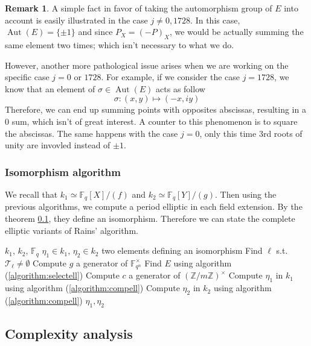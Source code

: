 \documentclass[12pt]{article}
\theoremstyle{plain}
\theoremstyle{definition}
\newtheorem*{remark}{Remark}
\DeclareMathOperator{\Aut}{Aut}
\def\Z{\ensuremath{\mathbb{Z}}}
\def\F{\ensuremath{\mathbb{F}}}
\newcounter{algorithm}
\begin{document}
\begin{remark}
A simple fact in favor of taking the automorphism group of $E$ into account is
easily illustrated in the case $j\neq0,1728$. In this case, $\Aut(E) =
\lbrace{\pm1}\rbrace$ and since $P_X = (-P)_X$, we would be actually summing the
same element two times; which isn't necessary to what we do.

However, another more pathological issue arises when we are working on the
specific case $j = 0$ or $1728$. For example, if we consider the case $j =
1728$, we know that an element of $\sigma\in\Aut(E)$ acts as follow
\[
\sigma : (x,y) \mapsto (-x, iy)
\]
Therefore, we can end up summing points with opposites abscissas, resulting in a
$0$ sum, which isn't of great interest. A counter to this phenomenon is to
square the abscissas. The same happens with the case $j = 0$, only this time
$3$rd roots of unity are invovled instead of $\pm1$.
\end{remark}

\subsubsection{Isomorphism algorithm}

We recall that $k_1\simeq\F_q[X]/(f)$ and $k_2\simeq\F_q[Y]/(g)$. Then using the
previous algorithms, we compute a period elliptic in each field extension. By
the theorem \ref{}, they define an isomorphism. Therefore we can state the
complete elliptic variants of Rains' algorithm.

\begin{algorithm}
\label{algorithm:rainsell}
    \begin{algorithmic}[1]
    \REQUIRE $k_1$, $k_2$, $\F_q$
    \ENSURE $\eta_1\in k_1$, $\eta_2\in k_2$ two elements defining an
isomorphism
    \STATE Find $\ell$ s.t. $\mathcal{T}_\ell\neq\emptyset$
    \STATE Compute $g$ a generator of $\F_{q^n}^{\times}$
    \STATE Find $E$ using algorithm (\ref{algorithm:selectell})
    \STATE Compute $c$ a generator of $(\Z/m\Z)^{\times}$
    \STATE Compute $\eta_1$ in $k_1$ using algorithm (\ref{algorithm:compell})
    \STATE Compute $\eta_2$ in $k_2$ using algorithm (\ref{algorithm:compell})
    \RETURN $\eta_1, \eta_2$
    \end{algorithmic}
\end{algorithm}

\subsection{Complexity analysis}
\end{document}
